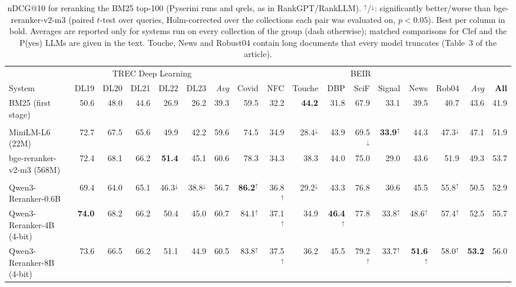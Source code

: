\begin{table}[t]
\centering
\footnotesize
\setlength{\tabcolsep}{2.1pt}
\caption{nDCG@10 for reranking the BM25 top-100 (Pyserini runs and qrels, as in RankGPT/RankLLM). $^\uparrow$/$^\downarrow$: significantly better/worse than bge-reranker-v2-m3 (paired $t$-test over queries, Holm-corrected over the collections each pair was evaluated on, $p<0.05$). Best per column in bold. Averages are reported only for systems run on every collection of the group (dash otherwise); matched comparisons for Clef and the P(yes) LLMs are given in the text. Touche, News and Robust04 contain long documents that every model truncates (Table~3 of the article).}
\label{tab:ranking-full}
\begin{tabular}{lrrrrr|r|rrrrrrrr|r|r}
\toprule
 & \multicolumn{6}{c|}{TREC Deep Learning} & \multicolumn{9}{c|}{BEIR} & \\
System & DL19 & DL20 & DL21 & DL22 & DL23 & \textit{Avg} & Covid & NFC & Touche & DBP & SciF & Signal & News & Rob04 & \textit{Avg} & \textbf{All} \\
\midrule
BM25 (first stage) & 50.6 & 48.0 & 44.6 & 26.9 & 26.2 & 39.3 & 59.5 & 32.2 & \textbf{44.2} & 31.8 & 67.9 & 33.1 & 39.5 & 40.7 & 43.6 & 41.9 \\
\addlinespace[1pt]
\multicolumn{17}{l}{\textit{Cross-encoders}} \\
MiniLM-L6 (22M) & 72.7 & 67.5 & 65.6 & 49.9 & 42.2 & 59.6 & 74.5 & 34.9 & 28.4$^\downarrow$ & 43.9 & 69.5$^\downarrow$ & \textbf{33.9}$^\uparrow$ & 44.3 & 47.3$^\downarrow$ & 47.1 & 51.9 \\
bge-reranker-v2-m3 (568M) & 72.4 & 68.1 & 66.2 & \textbf{51.4} & 45.1 & 60.6 & 78.3 & 34.3 & 38.3 & 44.0 & 75.0 & 29.0 & 43.6 & 51.9 & 49.3 & 53.7 \\
\addlinespace[1pt]
\multicolumn{17}{l}{\textit{Label-probability LLM rerankers}} \\
Qwen3-Reranker-0.6B & 69.4 & 64.0 & 65.1 & 46.3$^\downarrow$ & 38.8$^\downarrow$ & 56.7 & \textbf{86.2}$^\uparrow$ & 36.8$^\uparrow$ & 29.2$^\downarrow$ & 43.3 & 76.8 & 30.6 & 45.5 & 55.8$^\uparrow$ & 50.5 & 52.9 \\
Qwen3-Reranker-4B (4-bit) & \textbf{74.0} & 68.2 & 66.2 & 50.4 & 45.0 & 60.7 & 84.1$^\uparrow$ & 37.1$^\uparrow$ & 34.9 & \textbf{46.4}$^\uparrow$ & 77.8 & 33.8$^\uparrow$ & 48.6$^\uparrow$ & 57.4$^\uparrow$ & 52.5 & 55.7 \\
Qwen3-Reranker-8B (4-bit) & 73.6 & 66.5 & 66.2 & 51.1 & 44.9 & 60.5 & 83.8$^\uparrow$ & 37.5$^\uparrow$ & 36.2 & 45.5 & 79.2$^\uparrow$ & 33.7$^\uparrow$ & \textbf{51.6}$^\uparrow$ & 58.0$^\uparrow$ & \textbf{53.2} & 56.0 \\

\end{tabular}
\end{table}
